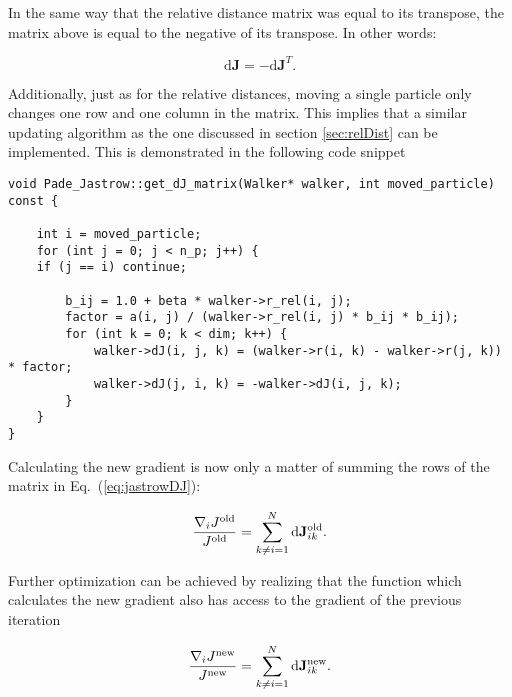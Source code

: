 In the same way that the relative distance matrix was equal to its transpose, the matrix above is equal to the negative of its transpose. In other words:

\begin{equation}
 \mathrm{d}\mathbf{J} = -\mathrm{d}\mathbf{J}^T.
\end{equation}

Additionally, just as for the relative distances, moving a single particle only changes one row and one column in the matrix. This implies that a similar updating algorithm as the one discussed in section \ref{sec:relDist} can be implemented. This is demonstrated in the following code snippet

\vspace{0.25cm}
\begin{lstlisting}[caption={The updating algorithm for the three-dimensional matrix used in the Padé Jastrow gradient. Pay close attention to line 11, where the symmetry property is exploited by setting the transposed term equal to the negative of an already calculated term.}]
void Pade_Jastrow::get_dJ_matrix(Walker* walker, int moved_particle) const {
    
    int i = moved_particle;
    for (int j = 0; j < n_p; j++) {
	if (j == i) continue;
	
        b_ij = 1.0 + beta * walker->r_rel(i, j);
        factor = a(i, j) / (walker->r_rel(i, j) * b_ij * b_ij);
        for (int k = 0; k < dim; k++) {
            walker->dJ(i, j, k) = (walker->r(i, k) - walker->r(j, k)) * factor;
            walker->dJ(j, i, k) = -walker->dJ(i, j, k);
        }
    }
}
\end{lstlisting}


Calculating the new gradient is now only a matter of summing the rows of the matrix in Eq.~(\ref{eq:jastrowDJ}):

\begin{equation}
\frac{\nabla_i J^\mathrm{old}}{J^\mathrm{old}} = \sum_{k \ne i = 1}^N \mathrm{d}\mathbf{J}^\mathrm{old}_{ik}.\label{eq:jastrowGraDJold}
\end{equation}

Further optimization can be achieved by realizing that the function which calculates the new gradient also has access to the gradient of the previous iteration

\begin{equation}
 \frac{\nabla_i J^\mathrm{new}}{J^\mathrm{new}} = \sum_{k \ne i = 1}^N \mathrm{d}\mathbf{J}^\mathrm{new}_{ik}. \label{eq:jastrowGradDJnew}
\end{equation}

